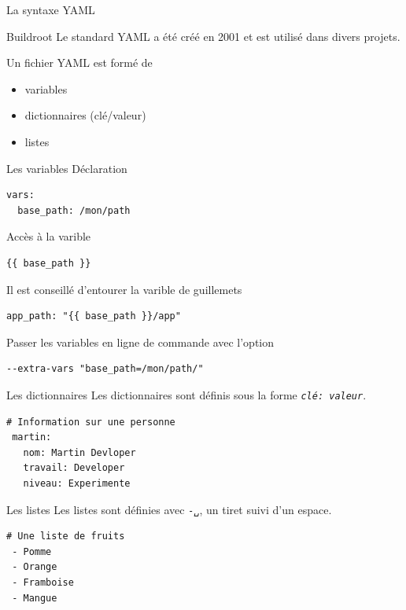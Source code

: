 \documentclass[compress]{smilebeamer}
\begin{document}
\begin{frame}
\begin{center}
\textcolor{smileOrange}{\huge{La syntaxe YAML}}
\end{center}
\end{frame}

\begin{frame}
\begin{exampleblock}{Buildroot}
Le standard YAML a été créé en 2001 et est utilisé dans divers projets.
\end{exampleblock}
Un fichier YAML est formé de
\begin{itemize}
	\item variables
	\item dictionnaires (clé/valeur)
	\item listes
\end{itemize}
\end{frame}

\begin{frame}[fragile]{Les variables}
Déclaration
\begin{lstlisting}[style=shell]
vars:
  base_path: /mon/path
\end{lstlisting}
Accès à la varible
\begin{lstlisting}[style=shell]
{{ base_path }}
\end{lstlisting}
Il est conseillé d'entourer la varible de guillemets
\begin{lstlisting}[style=shell]
app_path: "{{ base_path }}/app"
\end{lstlisting}
Passer les variables en ligne de commande avec l'option
\begin{lstlisting}[style=shell]
--extra-vars "base_path=/mon/path/"
\end{lstlisting}
\end{frame}

\begin{frame}[fragile]{Les dictionnaires}
Les dictionnaires sont définis sous la forme \textit{\texttt{clé: valeur}}.
\begin{lstlisting}[style=bitbake]
# Information sur une personne
 martin:
   nom: Martin Devloper
   travail: Developer
   niveau: Experimente
\end{lstlisting}
\end{frame}

\begin{frame}[fragile]{Les listes}
Les listes sont définies avec \textit{\texttt{-␣}}, un tiret suivi d’un espace.
\begin{lstlisting}[style=bitbake]
# Une liste de fruits
 - Pomme
 - Orange
 - Framboise
 - Mangue
\end{lstlisting}
\end{frame}
\end{document}
